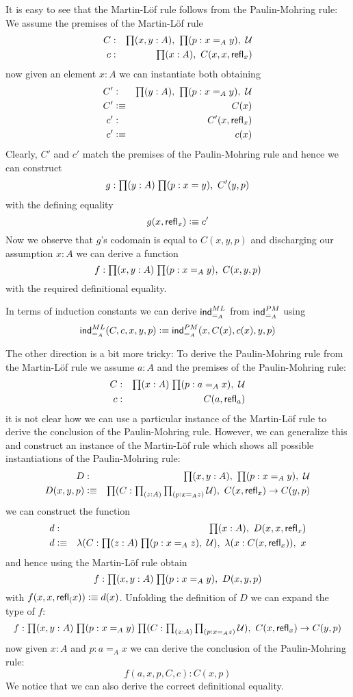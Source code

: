 It is easy to see that the Martin-L\"of rule follows from the
Paulin-Mohring rule: We assume 
the premises of the Martin-L\"of rule
\begin{eqnarray*}
C & : & \prd{x,y:A}\prd{p:x =_A y} \UU  \\
c & :  & \prd{x:A} C(x,x,\refl{x})
\end{eqnarray*}
now given an element $x:A$ we can instantiate both obtaining
\begin{eqnarray*}
C' & : & \prd{y:A}\prd{p:x =_A y} \UU  \\
C' & \defeq & C(x) \\
c' & : & C'(x,\refl{x}) \\
c' & \defeq & c(x)
\end{eqnarray*}
Clearly, $C'$ and $c'$ match the premises of the Paulin-Mohring rule and hence we can construct 
\begin{eqnarray*}
g : \prd{y:A}{p : x = y} C'(y,p)
\end{eqnarray*}
with the defining equality
\[ g(x,\mathsf{refl}_{x}) \vcentcolon\equiv c' \]
Now we observe that $g$'s codomain is equal to $C(x,y,p)$ and discharging our assumption
$x:A$ we can derive a function 
\[ f : \prd{x,y:A}{p : x =_A y} C(x,y,p) \]
with the required definitional equality.

In terms of induction constants we can derive $\mathsf{ind}_{=_A}^{ML}$ from $\mathsf{ind}_{=_A}^{PM}$ using
\[ \mathsf{ind}_{=_A}^{ML}(C,c,x,y,p) \vcentcolon\equiv \mathsf{ind}_{=_A}^{PM}(x,C(x),c(x),y,p) \]

The other direction is a bit more tricky: To derive the Paulin-Mohring rule from the Martin-L\"of rule 
we assume $a : A$ and the premises of the Paulin-Mohring rule:
\begin{eqnarray*}
C & : & \prd{x:A}{p : a =_A x} \UU \\  
c & : & C(a,\refl{a})
\end{eqnarray*}
it is not clear how we can use a particular instance of the Martin-L\"of rule to derive the conclusion of 
the Paulin-Mohring rule. However, we can generalize this and construct an instance of the Martin-L\"of rule which shows 
all possible instantiations of the Paulin-Mohring rule:
\begin{eqnarray*}
D & : & \prd{x,y:A}\prd{p:x =_A y} \UU \\
D(x,y,p) & \defeq & \prd{C : \prd{z:A}{p : x =_A z} \UU} C(x,\refl{x}) \to C(y,p)
\end{eqnarray*}
we can construct the function
\begin{eqnarray*}
d & : & \prd{x : A} D(x,x,\refl{x}) \\
d & \defeq & \lam{C:\prd{z:A}{p : x =_A z} \UU}\lam{x:C(x,\refl{x})} x
\end{eqnarray*}
and hence using the Martin-L\"of rule obtain
\[ f : \prd{x,y:A}{p:x =_A y} D(x,y,p) \]
with $f(x,x,\mathsf{refl}_{(} x)) \vcentcolon\equiv d(x)$. Unfolding the definition of $D$ we can expand the type of $f$:
\[ f : \prd{x,y:A}{p:x =_A y}{C : \prd{z:A}{p : x =_A z} \UU} C(x,\refl{x}) \to C(y,p) \]
now given $x:A$ and $p:a =_A x$ we can derive the conclusion of the Paulin-Mohring rule:
\[ f(a,x,p,C,c) : C(x,p) \]
We notice that we can also derive the correct definitional equality.

